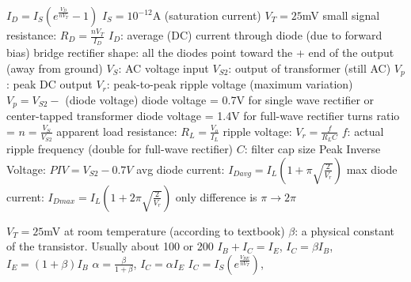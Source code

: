 \documentclass[12pt]{article}
\begin{document}
\begin{spacing}{0.8}
\begin{multicols*}{2}
\begin{flushleft}
\begin{outline}[longenum]
  \1 $I_D = I_S \left( e^{\frac{V_D}{n V_T}} - 1 \right)$
    \2 $I_S=10^{-12}$A (saturation current)
    \2 $V_T=25$mV
  \1 small signal resistance: $R_D = \frac{nV_T}{I_D}$
    \2 $I_D$: average (DC) current through diode (due to forward bias)
  \1 bridge rectifier shape: all the diodes point toward the + end of the output (away from ground)
  \1 $V_S$: AC voltage input
  \1 $V_{S2}$: output of transformer (still AC)
  \1 $V_p$: peak DC output
  \2 $V_r$: peak-to-peak ripple voltage (maximum variation)
  \1 $V_p=V_{S2}-$ (diode voltage)
    \2 diode voltage = 0.7V for single wave rectifier or center-tapped transformer
    \2 diode voltage = 1.4V for full-wave rectifier
  \1 turns ratio = $n=\frac{V_S}{V_{S2}}$
  \1 apparent load resistance: $R_L = \frac{V_o}{I_L}$
  \1 ripple voltage: $V_r=\frac{f}{R_L C}$
    \2 $f$: actual ripple frequency (double for full-wave rectifier)
    \2 $C$: filter cap size
  \1 Peak Inverse Voltage: $ PIV = V_{S2}-0.7V$
  \1 avg diode current: $I_{Davg}=I_L \left( 1+\pi\sqrt{\frac{2}{V_r}} \right)$
  \1 max diode current: $I_{Dmax}=I_L \left( 1+2\pi\sqrt{\frac{2}{V_r}} \right)$
    \2 only difference is $\pi \rightarrow 2\pi$

  \1 $V_T = 25$mV at room temperature (according to textbook)
  \1 $\beta$: a physical constant of the transistor. Usually about 100 or 200
  \1 
    $I_B + I_C = I_E$, 
    $I_C = \beta I_B$,
    $I_E = (1+\beta) I_B$
  \1
    $\alpha = \frac{\beta}{1+\beta}$,
    $I_C = \alpha I_E$
  \1
    $I_C = I_S ( e^{\frac{V_{BE}}{n V_T}} )$,





\end{outline}
\end{flushleft}
\end{multicols*}
\end{spacing}
\end{document}
